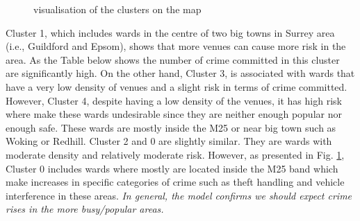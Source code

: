 \documentclass[12pt]{article}
\begin{document}
\begin{figure}[!htb]
        \caption{\label{fig:map} visualisation of the clusters on the map}
      \end{figure}


Cluster 1, which includes wards in the centre of two big towns in Surrey area (i.e., Guildford and Epsom), shows that more venues can cause more risk in the area. As the Table below shows the number of crime committed in this cluster are significantly high. On the other hand, Cluster 3, is associated with wards that have a very low density of venues and a slight risk in terms of crime committed. However, Cluster 4, despite having a low density of the venues, it has high risk where make these wards undesirable since they are neither enough popular nor enough safe. These wards are mostly inside the M25 or near big town such as Woking or Redhill. Cluster 2 and 0 are slightly similar. They are wards with moderate density and relatively moderate risk. However, as presented in Fig. \ref{fig:map}, Cluster 0 includes wards where mostly are located inside the M25 band which make increases in specific categories of crime such as theft handling and vehicle interference in these areas. 
 \textit{In general, the model confirms we should expect crime rises in the more busy/popular areas. } 
 
 
\end{document}
